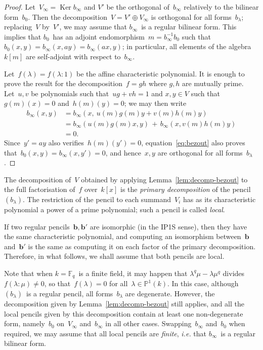 \documentclass{lms}%
\DeclareMathOperator\Ker{Ker}
\def\F{\mathbb{F}}
\begin{document}
\begin{proof}
Let~$V_{∞} = \Ker b_{∞}$ and $V'$ be the orthogonal of~$b_{∞}$ relatively
to the bilinear form~$b_{0}$. Then the decomposition~$V = V' ⊕ V_{∞}$ is
orthogonal for all forms~$b_{λ}$; replacing~$V$ by~$V'$, we may assume
that $b_{∞}$~is a regular bilinear form. This implies that $b_0$~has an
adjoint endomorphism~$m = b_{∞}^{-1} b_0$ such that~$b_0(x,y) = b_{∞}(x,
ay) = b_{∞}(ax, y)$; in particular, all elements of the algebra~$k[m]$
are self-adjoint with respect to~$b_{∞}$.

Let~$f(λ) = f(λ: 1)$ be the affine characteristic polynomial. It is
enough to prove the result for the decomposition~$f = gh$ where $g, h$
are mutually prime. Let~$u, v$ be polynomials such that~$ug + vh = 1$ and
$x, y ∈ V$ such that~$g(m)(x) = 0$ and~$h(m)(y) = 0$; we may then write
\begin{equation}\label{eq:bezout}
\begin{split}
b_{∞} (x, y) & = b_{∞} (x,\: u(m) g(m) y + v(m) h(m) y ) \\
&= b_{∞} (u(m) g(m) x, y) \,+\, b_{∞} (x, v(m) h(m) y) \\
&= 0.
\end{split}
\end{equation}
Since~$y' = ay$ also verifies~$h(m)(y') = 0$, equation~\eqref{eq:bezout}
also proves that~$b_{0}(x,y) = b_{∞}(x,y') = 0$, and hence~$x, y$ are
orthogonal for all forms~$b_{λ}$.
\end{proof}%

The decomposition of~$V$ obtained by applying
Lemma~\ref{lem:decomp-bezout} to the full factorisation of~$f$
over~$k[x]$ is the \emph{primary decomposition} of the pencil~$(b_{λ})$.
The restriction of the pencil to each summand~$V_i$ has as its
characteristic polynomial a power of a prime polynomial; such a pencil is
called \emph{local}.

If two regular pencils~$\bm{b}, \bm{b}'$ are isomorphic (in the IP1S sense), then
they have the same characteristic polynomial, and computing an
isomorphism between~$\bm{b}$ and~$\bm{b}'$ is the same as computing it on each
factor of the primary decomposition. Therefore, in what follows, we shall
assume that both pencils are local.

\medskip

Note that when $k = \F_q$~is a finite field, it may happen that $λ^q μ -
λ μ^q$ divides~$f(λ:μ) ≠ 0$, so that~$f(λ) = 0$ for all~$λ ∈ ℙ^1(k)$. In
this case, although $(b_{λ})$~is a regular pencil, all forms~$b_{λ}$ are
degenerate. However, the decomposition given by
Lemma~\ref{lem:decomp-bezout} still applies, and all the local pencils
given by this decomposition contain at least one non-degenerate form,
namely~$b_{0}$ on~$V_{∞}$ and~$b_{∞}$ in all other cases.
Swapping~$b_{∞}$ and~$b_{0}$ when required, we may assume that all local
pencils are \emph{finite}, \emph{i.e.} that $b_{∞}$~is a regular bilinear
form.
\end{document}
